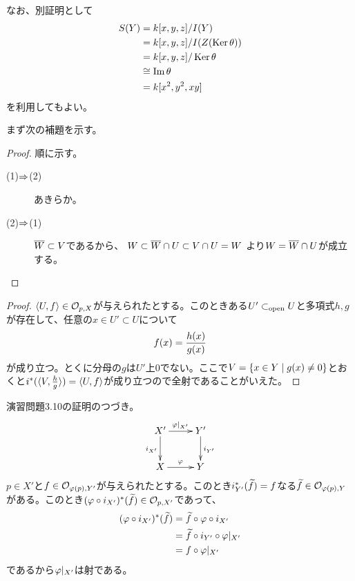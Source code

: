   なお、別証明として
  \begin{align*}
      S(Y) &= k[x,y,z] / I(Y) \\
      &= k[x,y,z] / I(Z(\operatorname{Ker} {\theta})) \\
      &= k[x,y,z] / \operatorname{Ker} {\theta} \\
      &\cong \operatorname{Im} {\theta} \\
      &= k[x^2,y^2,xy]
  \end{align*}
  を利用してもよい。







まず次の補題を示す。


\begin{proof}
  順に示す。
  \begin{description}
    \item[(1)$\Rightarrow$(2)] あきらか。
    \item[(2)$\Rightarrow$(1)] $\overline{W} \subset V $であるから、
    $W \subset \overline{W} \cap U \subset V \cap U = W$
    より$W = \overline{W} \cap U$が成立する。
  \end{description}
\end{proof}





\begin{proof}
  $\langle U,f \rangle \in \mathcal{O}_{p,X}$が与えられたとする。このときある$U' \subset_{\text{open}} U$と多項式$h,g$が存在して、任意の$x \in U' \subset U$について
  \[
  f(x) = \frac{h(x)}{g(x)}
  \]
  が成り立つ。とくに分母の$g$は$U'$上$0$でない。ここで$V = \left\{ x \in Y \mathrel{} \middle| \mathrel{} g(x) \neq 0 \right\}$とおくと$i^*(\langle V, \frac{h}{g}  \rangle) = \langle U,f \rangle$が成り立つので全射であることがいえた。
\end{proof}

演習問題3.10の証明のつづき。
\[
\xymatrix{
X' \ar[r]^{\vp|_{X'}} \ar[d]_{i_{X'}} & Y' \ar[d]^{i_{Y'}} \\
X \ar[r]^{\vp} & Y
}
\]
$p \in X'$と$f \in \mathcal{O}_{{\varphi}(p), Y'}$が与えられたとする。このとき$i^*_{Y'} (\widetilde{f}) = f$なる$\widetilde{f} \in \mathcal{O}_{{\varphi}(p), Y}$がある。このとき$({\varphi} \circ i_{X'})^*(\widetilde{f}) \in \mathcal{O}_{p,X'}$であって、
\begin{align*}
({\varphi} \circ i_{X'})^*(\widetilde{f}) &= \widetilde{f} \circ {\varphi} \circ i_{X'} \\
&= \widetilde{f} \circ i_{Y'} \circ {\varphi}|_{X'} \\
&= f \circ {\varphi}|_{X'}
\end{align*}
であるから${\varphi}|_{X'}$は射である。


